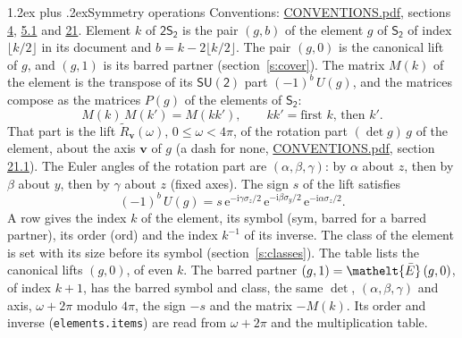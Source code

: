 \documentclass[10pt,a4paper]{article}
\makeatletter
\renewcommand\section{\@startsection{section}{1}{\z@}{-3ex plus -1ex minus -.2ex}%
  {1.2ex plus .2ex}{\normalfont\large\sffamily\bfseries\color{parttitle}}}
\numberwithin{equation}{section}
\newcommand{\eltfont}[1]{{\let\sigma\eltsigma\mathelt{#1}}}
\newcommand{\grp}[1]{\mathsf{#1}}
\newcommand{\elt}[1]{\eltfont{#1}}
\newcommand{\vv}{\mathbf{v}}
\newcommand{\iunit}{\mathrm{i}}
\newcommand{\expe}{\mathrm{e}}
\newcommand{\barred}[1]{\bar{#1}}
\newcommand{\lift}[1]{\tilde{#1}}
\newcommand{\pauli}[1]{\sigma_{#1}}
\makeatother
\begin{document}
\section{Symmetry operations}\label{s:elements}
Conventions: \href{../../CONVENTIONS.pdf}{CONVENTIONS.pdf}, sections \href{../../../rotation/CONVENTIONS.pdf\#conv.4}{4}, \href{../../../rotation/CONVENTIONS.pdf\#conv.5.1}{5.1} and \href{../../CONVENTIONS.pdf\#conv.21}{21}.
\leavevmode\label{n:index.element}\label{n:element.g}Element $k$ of $\grp{2S_{2}}$ is the pair $(g, b)$ of the element $g$ of \href{../../../rotation/data/pdf/S2.pdf}{$\grp{S_{2}}$} of index $\lfloor k/2\rfloor$ in its document and $b = k - 2\lfloor k/2\rfloor$. The pair $(g, 0)$ is the canonical lift of $g$, and $(g, 1)$ is its barred partner (section~\ref{s:cover}). \label{n:matrix.element.pin}\label{n:matrix.element}The matrix $M(k)$ of the element is the transpose of its $\grp{SU(2)}$ part $(-1)^{b}\,U(g)$, and the matrices compose as the matrices $P(g)$ of the elements of $\grp{S_{2}}$:
\begin{equation}\label{e:mprod}M(k)\,M(k') = M(kk'),\qquad kk' = \text{first } k\text{, then } k'.\end{equation}
\leavevmode\label{n:angle.omega}\label{n:vector.axis}That part is the lift $\lift{R}_{\vv}(\omega)$, $0 \le \omega < 4\pi$, of the rotation part $(\det g)\,g$ of the element, about the axis $\vv$ of $g$ (a dash for none, \href{../../CONVENTIONS.pdf}{CONVENTIONS.pdf}, section \href{../../CONVENTIONS.pdf\#conv.21.1}{21.1}). \label{n:angle.euler.alpha}\label{n:angle.euler.beta}\label{n:angle.euler.gamma}\label{n:vector.coordinates}The Euler angles of the rotation part are $(\alpha,\beta,\gamma)$: by $\alpha$ about $z$, then by $\beta$ about $y$, then by $\gamma$ about $z$ (fixed axes). \label{n:local.euler.sign}The sign $s$ of the lift satisfies
\begin{equation}\label{e:euler}(-1)^{b}\,U(g) = s\,\expe^{-\iunit\gamma\pauli{z}/2}\,\expe^{-\iunit\beta\pauli{y}/2}\,\expe^{-\iunit\alpha\pauli{z}/2}.\end{equation}
\leavevmode\label{n:index.element.inverse}\label{n:head.sym}\label{n:head.ord}A row gives the index $k$ of the element, its symbol (sym, barred for a barred partner), its order (ord) and the index $k^{-1}$ of its inverse. \label{n:head.class}The class of the element is set with its size before its symbol (section~\ref{s:classes}).
The table lists the canonical lifts $(g, 0)$, of even $k$. The barred partner $(g, 1) = \elt{\barred{E}}\,(g, 0)$, of index $k + 1$, has the barred symbol and class, the same $\det$, $(\alpha,\beta,\gamma)$ and axis, $\omega + 2\pi$ modulo $4\pi$, the sign $-s$ and the matrix $-M(k)$. Its order and inverse (\texttt{elements.items}) are read from $\omega + 2\pi$ and the multiplication table.
\end{document}
